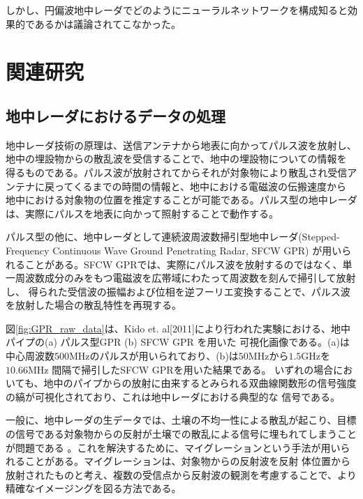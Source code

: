 \documentclass[11pt,a4paper,uplatex]{ujarticle}
\begin{document}
  しかし、円偏波地中レーダでどのようにニューラルネットワークを構成知ると効果的であるかは議論されてこなかった。
\section{関連研究}

  \subsection{地中レーダにおけるデータの処理}

    地中レーダ技術の原理は、送信アンテナから地表に向かってパルス波を放射し、地中の埋設物からの散乱波を受信することで、地中の埋設物についての情報を
    得るものである。パルス波が放射されてからそれが対象物により散乱され受信アンテナに戻ってくるまでの時間の情報と、地中における電磁波の伝搬速度から
    地中における対象物の位置を推定することが可能である。パルス型の地中レーダは、実際にパルスを地表に向かって照射することで動作する。

    パルス型の他に、地中レーダとして連続波周波数掃引型地中レーダ(Stepped-Frequency Continuous Wave Ground Penetrating Radar, SFCW GPR)
    が用いられることがある。SFCW GPRでは、実際にパルス波を放射するのではなく、単一周波数成分のみをもつ電磁波を広帯域にわたって周波数を刻んで掃引して放射し、
    得られた受信波の振幅および位相を逆フーリエ変換することで、パルス波を放射した場合の散乱特性を再現する\cite{stepped_frequency_continuous_wave}。

    図\ref{fig:GPR_raw_data}は、Kido et. al[2011]により行われた実験\cite{STFW_Kido}における、地中パイプの(a) パルス型GPR (b) SFCW GPR を用いた
    可視化画像である。(a)は中心周波数$500\mathrm{MHz}$のパルスが用いられており、(b)は$50\mathrm{MHz}$から$1.5\mathrm{GHz}$を$10.66\mathrm{MHz}$
    間隔で掃引したSFCW GPRを用いた結果である。
    いずれの場合においても、地中のパイプからの放射に由来するとみられる双曲線関数形の信号強度の縞が可視化されており、これは地中レーダにおける典型的な
    信号である。

    一般に、地中レーダの生データでは、土壌の不均一性による散乱が起こり、目標の信号である対象物からの反射が土壌での散乱による信号に埋もれてしまうことが問題である
    \cite{prestack_migration}。これを解決するために、マイグレーションという手法が用いられることがある。マイグレーションは、対象物からの反射波を反射
    体位置から放射されたものと考え、複数の受信点から反射波の観測を考慮することで、より精確なイメージングを図る方法である\cite{gpr_migration}。
\end{document}
